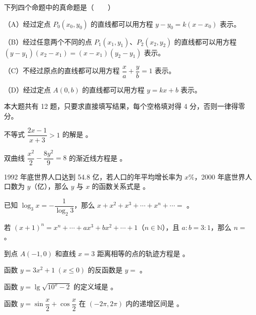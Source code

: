 \begin{question}
下列四个命题中的真命题是\mbox{（　　）}

（A）经过定点 $P_0(x_0,y_0)$ 的直线都可以用方程 $y-y_0=k(x-x_0)$ 表示。

（B）经过任意两个不同的点 $P_1(x_1,y_1)$、$P_2(x_2,y_2)$ 的直线都可以用方程 $(y-y_1)(x_2-x_1)=(x-x_1)(y_2-y_1)$ 表示。

（C）不经过原点的直线都可以用方程 $\dfrac xa+\dfrac yb=1$ 表示。

（D）经过定点 $A(0,b)$ 的直线都可以用方程 $y=kx+b$ 表示。

\end{question}

本大题共有 12 题，只要求直接填写结果，每个空格填对得 4 分，否则一律得零分。

\begin{question}
不等式 $\dfrac{2x-1}{x+3}>1$ 的解是 \gkblank{}。

\end{question}
\begin{question}
双曲线 $\dfrac{x^2}{2}-\dfrac{8y^2}{9}=8$ 的渐近线方程是 \gkblank{}。

\end{question}
\begin{question}
1992 年底世界人口达到 54.8 亿，若人口的年平均增长率为 $x\%$，2000 年底世界人口数为 $y$（亿），那么 $y$ 与 $x$ 的函数关系式是 \gkblank{}。

\end{question}
\begin{question}
已知 $\log_3x=-\dfrac1{\log_2 3}$，那么 $x+x^2+x^3+\cdots+x^n+\cdots=$ \gkblank{}。

\end{question}
\begin{question}
若 $(x+1)^n=x^n+\cdots+ax^3+bx^2+\cdots+1$（$n\in\mathbb N$），且 $a:b=3:1$，那么 $n=$ \gkblank{}。

\end{question}
\begin{question}
到点 $A(-1,0)$ 和直线 $x=3$ 距离相等的点的轨迹方程是 \gkblank{}。

\end{question}
\begin{question}
函数 $y=3x^2+1\;(x\le0)$ 的反函数是 $y=$ \gkblank{}。

\end{question}
\begin{question}
函数 $y=\lg\sqrt{10^x-2}$ 的定义域是 \gkblank{}。

\end{question}
\begin{question}
函数 $y=\sin\dfrac x2+\cos\dfrac x2$ 在 $(-2\pi,2\pi)$ 内的递增区间是 \gkblank{}。

\end{question}

